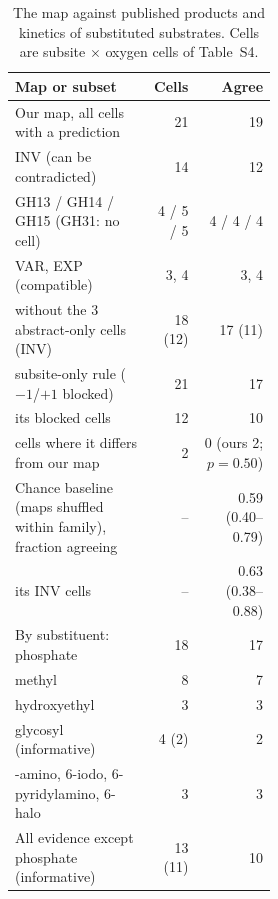 \documentclass[preprint,12pt]{elsarticle}
\begin{document}
\begin{table}[htbp]
\centering\renewcommand{\baselinestretch}{1}\footnotesize\setlength{\tabcolsep}{4pt}
\caption{The map against published products and kinetics of substituted substrates. Cells are subsite $\times$ oxygen cells of Table~S4.}
\label{tab:agree}
\begin{tabular}{>{\raggedright\arraybackslash}p{0.52\linewidth}rr}
\toprule
Map or subset & Cells & Agree\\
\midrule
Our map, all cells with a prediction & 21 & 19\\
\quad INV (can be contradicted) & 14 & 12\\
\quad\quad GH13 / GH14 / GH15 (GH31: no cell) & 4 / 5 / 5 & 4 / 4 / 4\\
\quad VAR, EXP (compatible) & 3, 4 & 3, 4\\
\quad without the 3 abstract-only cells (INV) & 18 (12) & 17 (11)\\
subsite-only rule ($-1$/$+1$ blocked) & 21 & 17\\
\quad its blocked cells & 12 & 10\\
\quad cells where it differs from our map & 2 & 0 (ours 2; $p = 0.50$)\\
Chance baseline (maps shuffled within family), fraction agreeing & -- & 0.59 (0.40--0.79)\\
\quad its INV cells & -- & 0.63 (0.38--0.88)\\
\addlinespace
By substituent: phosphate & 18 & 17\\
\quad methyl & 8 & 7\\
\quad hydroxyethyl & 3 & 3\\
\quad glycosyl (informative) & 4 (2) & 2\\
\quad 6-amino, 6-iodo, 6-pyridylamino, 6-halo & 3 & 3\\
All evidence except phosphate (informative) & 13 (11) & 10\\
\bottomrule
\end{tabular}

\par\smallskip{}
\end{table}
\end{document}
